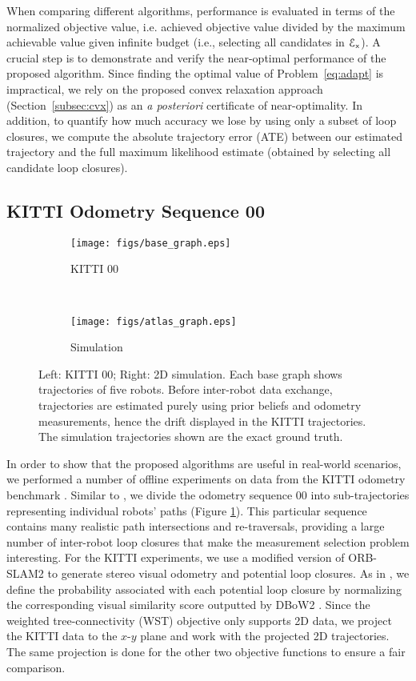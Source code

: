 \documentclass[conference]{IEEEtran}
\begin{document}
When comparing different algorithms, performance is evaluated in terms of the
normalized objective value, i.e. achieved objective value divided by the maximum
achievable value given infinite budget (i.e., selecting all candidates in $\mathcal{E}_\mathsf{x}$). A crucial step is to demonstrate and verify the near-optimal performance of the proposed algorithm. Since finding the optimal
value of Problem~\ref{eq:adapt} is impractical,
we rely on the proposed convex relaxation approach (Section~\ref{subsec:cvx})
as an \emph{a posteriori} certificate of near-optimality. 
In addition, to quantify how much accuracy we lose by using only a subset of loop
closures, we compute the absolute trajectory error (ATE) between our
estimated trajectory and the full maximum likelihood estimate (obtained by
selecting all candidate loop closures). 

\subsection{KITTI Odometry Sequence 00}

\begin{figure}[t]
\centering

\begin{subfigure}[t]{0.2\textwidth}
\centering
\texttt{[image: figs/base\_graph.eps]}
\caption{\small KITTI 00}
\label{fig:KITTI_00_base_graph}
\end{subfigure}
~
\begin{subfigure}[t]{0.2\textwidth}
\centering
\texttt{[image: figs/atlas\_graph.eps]}
\caption{\small Simulation}
\label{fig:Atlas_base_graph}
\end{subfigure}
\caption{\small Left: KITTI 00; Right: 2D simulation. Each base graph shows trajectories of five robots. Before inter-robot data exchange, trajectories are estimated purely using prior beliefs and odometry measurements, hence the drift displayed in the KITTI trajectories. The 
simulation trajectories shown are the exact ground truth.}
\end{figure}

In order to show that the proposed algorithms are useful in real-world
scenarios, we performed a number of offline experiments on data from the KITTI
odometry benchmark \cite{Geiger2012CVPR}. Similar to
\cite{CieslewskiChoudhary17}, we divide the odometry sequence $00$ into
sub-trajectories representing individual robots' paths (Figure
\ref{fig:KITTI_00_base_graph}). This particular sequence contains many realistic
path intersections and re-traversals, providing a large number of inter-robot
loop closures that make the measurement selection problem interesting. For the
KITTI experiments, we use a modified version of ORB-SLAM2 \cite{murORB2} to
generate stereo visual odometry and potential loop closures. As in
\cite{Giamou18_ICRA}, we define the probability associated with each potential
loop closure by normalizing the corresponding visual similarity score outputted
by DBoW2 \cite{GalvezTRO12}.  Since the weighted tree-connectivity (WST)
objective only supports 2D data, we project the KITTI data to the $x$-$y$ plane
and work with the projected 2D trajectories. The same projection is done for the
other two objective functions to ensure a fair comparison.
\end{document}
